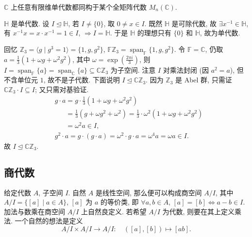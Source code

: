 \begin{theorem}\label{thm:simple-over-C}
$\mathbb{C}$ 上任意有限维单代数都同构于某个全矩阵代数 $M_n(\mathbb{C})$.
\end{theorem}

\begin{example}\label{ex:quaternion-simple}
$\mathbb{H}$ 是单代数.
设 $I\trianglelefteq\mathbb{H}$, 若 $I\neq\{0\}$, 取 $0\neq x\in I$.
既然 $\mathbb{H}$ 是可除代数, 故 $\exists x^{-1}\in\mathbb{H}$, 有 $x^{-1}x=x\cdot x^{-1}=1\in I$,
$\Rightarrow I=\mathbb{H}$. 于是 $\mathbb{H}$ 的理想只有 $\{0\}$ 和 $\mathbb{H}$, 故为单代数.
\end{example}

\begin{example}\label{ex:FZ3-decomposition}
回忆 $\mathbb{Z}_3=\langle g \mid g^3=1\rangle=\{1,g,g^2\}$,
$\mathbb{F}\mathbb{Z}_3=\operatorname{span}_{\mathbb{F}}\{1,g,g^2\}$.
令 $\mathbb{F}=\mathbb{C}$, 仍取 $a=\frac{1}{3}(1+\omega g+\omega^2 g^2)$, 其中 $\omega=\exp\left(\frac{2\pi i}{3}\right)$,
则 $I=\operatorname{span}_{\mathbb{F}}\{a\}=\operatorname{span}_{\mathbb{C}}\{a\}\subseteq\mathbb{C}\mathbb{Z}_3$ 为子空间.
注意 $I$ 对乘法封闭 (因 $a^2=a$), 但不含单位元 $1$, 故不是子代数.
下面说明 $I\trianglelefteq\mathbb{C}\mathbb{Z}_3$. 因为 $\mathbb{Z}_3$ 是 Abel 群, 只需证
$\mathbb{C}\mathbb{Z}_3\cdot I\subseteq I$; 又只需对基验证.
\[\begin{aligned}
  &g\cdot a=g\cdot\tfrac13\left(1+\omega g+\omega^2g^2\right)\\
  &\phantom{g\cdot a}=\tfrac13\left(g+\omega g^2+\omega^2\right)
   =\tfrac13\cdot\omega^2\left(1+\omega g+\omega^2g^2\right)\\
  &\phantom{g\cdot a}=\omega^2a\in I,\\
  &g^2\cdot a=g\cdot(g\cdot a)=\omega^2\cdot g\cdot a=\omega^4a=\omega a\in I .
\end{aligned}\]
故 $I\trianglelefteq\mathbb{C}\mathbb{Z}_3$.
\end{example}

\subsection{商代数}

给定代数 $A$, 子空间 $I$. 自然 $A$ 是线性空间, 那么便可以构成商空间 $A/I$,
其中 $A/I=\{[a]\mid a\in A\}$, $[a]$ 为 $a$ 的等价类, 即 $\forall a,b\in A$,
$[a]=[b]\Leftrightarrow a-b\in I$. 加法与数乘在商空间 $A/I$ 上自然良定义.
若希望 $A/I$ 为代数, 则要在其上定义乘法. 一个自然的想法是定义
\[
  A/I\times A/I\longrightarrow A/I\colon\quad ([a],[b])\longmapsto[ab].
\]


